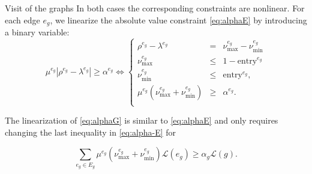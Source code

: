 \documentclass[slidestop,usepdftitle=false,10pt]{beamer}
\begin{document}
	\begin{frame}{Visit of the graphs}
	    In both cases the corresponding constraints are nonlinear. For each edge $e_g$, we linearize the absolute value constraint \eqref{eq:alphaE} by introducing a binary variable:
        \begin{equation}\label{eq:alpha-E}\tag{$\alpha$-E}
         \mu^{e_g}|\rho^{e_g}-\lambda^{e_g}|\geq \alpha^{e_g} \Longleftrightarrow
         \left\{
         \begin{array}{ccl}
          \rho^{e_g} - \lambda^{e_g}                       & =    & \nu_\text{max}^{e_g} - \nu_\text{min}^{e_g}                                     \\
          \nu_\text{max}^{e_g}                         & \leq & 1-{\text{entry}^{e_g}}                                    \\
          \nu_\text{min}^{e_g}                      & \leq & {  \text{entry}^{e_g}},                                        \\
          \mu^{e_g}(\nu_\text{max}^{e_g} + \nu_\text{min}^{e_g} ) & \geq & \alpha^{e_g}.
          \\
         \end{array}
         \right.
        \end{equation}
        
        \noindent
        The linearization of \eqref{eq:alphaG} is similar to \eqref{eq:alphaE} and only requires changing the last inequality in \eqref{eq:alpha-E} for
        
        \begin{equation}\label{eq:alpha-G}\tag{$\alpha$-G}
        \sum_{e_g\in E_g} \mu^{e_g}(\nu_\text{max}^{e_g} + \nu_\text{min}^{e_g})\mathcal L(e_g)\geq \alpha_g\mathcal L(g).
        \end{equation}
	\end{frame}
	
\end{document}
